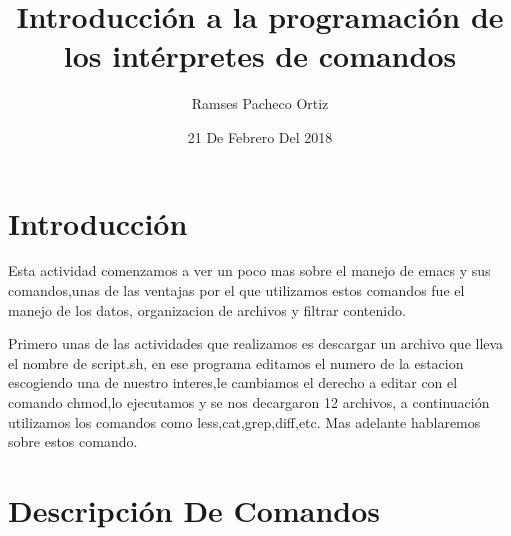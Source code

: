 \documentclass{article}
\begin{document}
\title{Introducción a la programación de los intérpretes de comandos}
\author{Ramses Pacheco Ortiz}
\date{21 De Febrero Del 2018}
\maketitle  


\section{Introducción}

Esta actividad comenzamos a ver un poco mas sobre el manejo de emacs y sus comandos,unas de las ventajas por el que utilizamos estos comandos fue el manejo de los datos, organizacion de archivos y filtrar contenido.

Primero unas de las actividades que realizamos es descargar un archivo que lleva el nombre de script.sh, en ese programa editamos el numero de la estacion escogiendo una de nuestro interes,le cambiamos el derecho a editar con el comando chmod,lo ejecutamos y se nos decargaron 12 archivos, a continuación utilizamos los comandos como less,cat,grep,diff,etc. Mas adelante hablaremos sobre estos comando.

\section{Descripción De Comandos}
\end{document}

